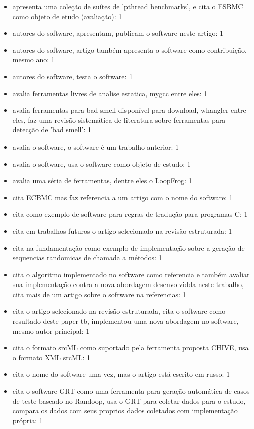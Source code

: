 \begin{itemize}
\item apresenta uma coleção de suítes de 'pthread benchmarks', e cita o ESBMC como objeto de etudo (avaliação): 1
\item autores do software, apresentam, publicam o software neste artigo: 1
\item autores do software, artigo também apresenta o software como contribuição, mesmo ano: 1
\item autores do software, testa o software: 1
\item avalia ferramentas livres de analise estatica, mygcc entre eles: 1
\item avalia ferramentas para bad smell disponível para download, whangler entre eles, faz uma revisão sistemática de literatura sobre ferramentas para detecção de 'bad smell': 1
\item avalia o software, o software é um trabalho anterior: 1
\item avalia o software, usa o software como objeto de estudo: 1
\item avalia uma séria de ferramentas, dentre eles o LoopFrog: 1
\item cita ECBMC mas faz referencia a um artigo com o nome do software: 1
\item cita como exemplo de software para regras de tradução para programas C: 1
\item cita em trabalhos futuros o artigo selecionado na revisão estruturada: 1
\item cita na fundamentação como exemplo de implementação sobre a geração de sequencias randomicas de chamada a métodos: 1
\item cita o algoritmo implementado no software como referencia e também avaliar sua implementação contra a nova abordagem desenvolvidda neste trabalho, cita mais de um artigo sobre o software na referencias: 1
\item cita o artigo selecionado na revisão estruturada, cita o software como resultado deste paper tb, implementou uma nova abordagem no software, mesmo autor principal: 1
\item cita o formato srcML como suportado pela ferramenta proposta CHIVE, usa o formato XML srcML: 1
\item cita o nome do software uma vez, mas o artigo está escrito em russo: 1
\item cita o software GRT como uma ferramenta para geração automática de casos de teste baseado no Randoop, usa o GRT para coletar dados para o estudo, compara os dados com seus proprios dados coletados com implementação própria: 1

\end{itemize}
